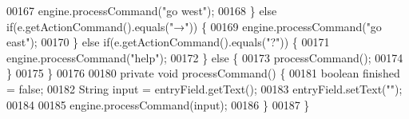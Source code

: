 \begin{DoxyCode}
00167             engine.processCommand(\textcolor{stringliteral}{"go west"});
00168         \} \textcolor{keywordflow}{else} \textcolor{keywordflow}{if}(e.getActionCommand().equals(\textcolor{stringliteral}{"→"})) \{
00169             engine.processCommand(\textcolor{stringliteral}{"go east"});
00170         \} \textcolor{keywordflow}{else} \textcolor{keywordflow}{if}(e.getActionCommand().equals(\textcolor{stringliteral}{"?"})) \{
00171             engine.processCommand(\textcolor{stringliteral}{"help"});
00172         \} \textcolor{keywordflow}{else} \{
00173             processCommand();
00174         \}
00175     \}
00176 
00180     \textcolor{keyword}{private} \textcolor{keywordtype}{void} processCommand() \{
00181         \textcolor{keywordtype}{boolean} finished = \textcolor{keyword}{false};
00182         String input = entryField.getText();
00183         entryField.setText(\textcolor{stringliteral}{""});
00184 
00185         engine.processCommand(input);
00186     \}
00187 \}
\end{DoxyCode}
